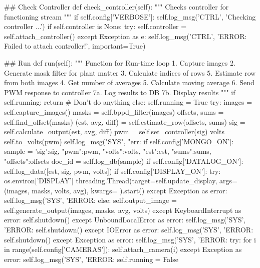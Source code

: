 \begin{python}
    ## Check Controller
    def check_controller(self):
        """ Checks controller for functioning stream """
        if self.config['VERBOSE']: self.log_msg('CTRL', 'Checking controller ...')
        if self.controller is None:
            try:
                self.controller = self.attach_controller()
            except Exception as e:
                self.log_msg('CTRL', 'ERROR: Failed to attach controller!', important=True)

    ## Run  
    def run(self):
        """
        Function for Run-time loop
        1. Capture images
        2. Generate mask filter for plant matter
        3. Calculate indices of rows
        5. Estimate row from both images
        4. Get number of averages
        5. Calculate moving average
        6. Send PWM response to controller
        7a. Log results to DB
        7b. Display results
        """
        if self.running: 
            return # Don't do anything
        else:
            self.running = True
            try:
                images = self.capture_images()
                masks = self.bppd_filter(images)
                offsets, sums = self.find_offset(masks)
                (est, avg, diff) = self.estimate_row(offsets, sums)
                sig = self.calculate_output(est, avg, diff)
                pwm = self.set_controller(sig)
                volts = self.to_volts(pwm)
                self.log_msg("SYS", "err:%
                if self.config['MONGO_ON']:
                    sample = {'sig':sig, "pwm":pwm, "volts":volts, "est":est, "sums":sums, "offsets":offsets}
                    doc_id = self.log_db(sample)
                if self.config['DATALOG_ON']: self.log_data([est, sig, pwm, volts])
                if self.config['DISPLAY_ON']:
                    try:
                        os.environ['DISPLAY']
                        threading.Thread(target=self.update_display,
                            args=(images, masks, volts, avg),
                            kwargs={}
                        ).start()
                    except Exception as error:
                        self.log_msg('SYS', 'ERROR: %
                else:
                    self.output_image = self.generate_output(images, masks, avg, volts)  
            except KeyboardInterrupt as error:
                self.shutdown()
            except UnboundLocalError as error:
                self.log_msg('SYS', 'ERROR: %
                self.shutdown()
            except IOError as error:
                self.log_msg('SYS', 'ERROR: %
                self.shutdown()
            except Exception as error:
                self.log_msg('SYS', 'ERROR: %
                try:
                    for i in range(self.config['CAMERAS']):
                        self.attach_camera(i)
                except Exception as error:
                    self.log_msg('SYS', 'ERROR: %
            self.running = False


\end{python}
